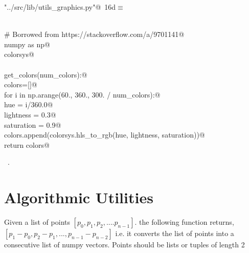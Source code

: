 \documentclass[11.5pt]{report}
\begin{document}
\begin{flushleft} \small\label{scrap11}\raggedright\small
{} \verb@"../src/lib/utils_graphics.py"@\nobreak\ {\footnotesize {16d}}$\equiv$
\vspace{-1ex}
\begin{list}{}{} \item
\mbox{}\verb@@\\
\mbox{}\verb@# Borrowed from https://stackoverflow.com/a/9701141@\\
\mbox{}\verb@import numpy as np@\\
\mbox{}\verb@import colorsys@\\
\mbox{}\verb@@\\
\mbox{}\verb@def get_colors(num_colors):@\\
\mbox{}\verb@    colors=[]@\\
\mbox{}\verb@    for i in np.arange(60., 360., 300. / num_colors):@\\
\mbox{}\verb@        hue        = i/360.0@\\
\mbox{}\verb@        lightness  = 0.3@\\
\mbox{}\verb@        saturation = 0.9@\\
\mbox{}\verb@        colors.append(colorsys.hls_to_rgb(hue, lightness, saturation))@\\
\mbox{}\verb@    return colors@\\
\mbox{}\verb@@{\NWsep}
\end{list}
\vspace{-1.5ex}
\footnotesize
\begin{list}{}{\setlength{\itemsep}{-\parsep}\setlength{\itemindent}{-\leftmargin}}
\item \NWtxtFileDefBy\ .

\item{}
\end{list}
\vspace{4ex}
\end{flushleft}


\section{Algorithmic Utilities}

\newchunk Given a list of  points $[p_0,p_1,p_2,....p_{n-1}]$. 
    the following function returns, $[p_1-p_0, p_2-p_1,...,p_{n-1}-p_{n-2}]$
    i.e. it converts the list of points into a consecutive list of numpy vectors. 
    Points should be lists or tuples of length 2
\end{document}
